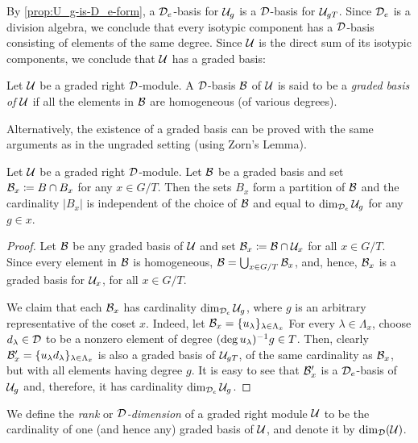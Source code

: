 By \cref{prop:U_g-is-D_e-form}, a $\mathcal{D}_e$-basis for $\mathcal U_g$ is a $\mathcal{D}$-basis for $\mathcal U_{gT}$. 
Since $\mathcal{D}_e$ is a division algebra, we conclude that every isotypic component has a $\mathcal{D}$-basis consisting of elements of the same degree. 
Since $\mathcal U$ is the direct sum of its isotypic components, we conclude that $\mathcal U$ has a graded basis:

\begin{defi}
    Let $\mathcal U$ be a graded right $\mathcal{D}$-module. 
    A $\mathcal{D}$-basis $\mathcal B$ of $\mathcal U$ is said to be a \emph{graded basis of $\mathcal U$} if all the elements in $\mathcal B$ are homogeneous (of various degrees).
\end{defi}

\begin{remark}
    Alternatively, the existence of a graded basis can be proved with the same arguments as in the ungraded setting (using Zorn's Lemma).
\end{remark}

\begin{prop}\label{prop:dim-U_x}
    Let $\mathcal U$ be a graded right $\mathcal{D}$-module. 
    Let $\mathcal B$ be a graded basis and set $\mathcal B_x \coloneqq B \cap B_x$ for any $x\in G/T$. 
    Then the sets $B_x$ form a partition of $\mathcal B$ and the cardinality $|B_x|$ is independent of the choice of $\mathcal B$ and equal to $\dim_{\mathcal{D}_e} \mathcal U_g$ for any $g\in x$. 
\end{prop}

\begin{proof}
    Let $\mathcal B$ be any graded basis of $\mathcal U$ and set $\mathcal B_x \coloneqq \mathcal B \cap \mathcal U_x$ for all $x\in G/T$. 
    Since every element in $\mathcal B$ is homogeneous, $\mathcal B = \bigcup_{x \in G/T} \mathcal B_x$, and, hence, $\mathcal B_x$ is a graded basis for $\mathcal U_x$, for all $x\in G/T$.
    
    We claim that each $\mathcal B_x$ has cardinality $\dim_{\mathcal{D}_e} \mathcal U_g$, where $g$ is an arbitrary representative of the coset $x$. 
    Indeed, let $\mathcal B_x = \{ u_\lambda\}_{\lambda \in \Lambda_x}$
    For every $\lambda \in \Lambda_x$, choose $d_\lambda \in \mathcal{D}$ to be a nonzero element of degree $(\deg u_\lambda)^{-1} g \in T$. 
    Then, clearly $\mathcal B_x' = \{u_\lambda d_\lambda \}_{\lambda \in \Lambda_x}$ is also a graded basis of $\mathcal U_{gT}$, of the same cardinality as $\mathcal B_x$, but with all elements having degree $g$. 
    It is easy to see that $\mathcal B_x'$ is a $\mathcal{D}_e$-basis of $\mathcal U_g$ and, therefore, it has cardinality $\dim_{\mathcal{D}_e} \mathcal U_g$. 
\end{proof}

\begin{defi}
    We define the \emph{rank} or \emph{$\mathcal{D}$-dimension} of a graded right module $\mathcal U$ to be the cardinality of one (and hence any) graded basis of $\mathcal U$, and denote it by $\dim_{\mathcal{D}} (\mathcal U)$.
\end{defi}

